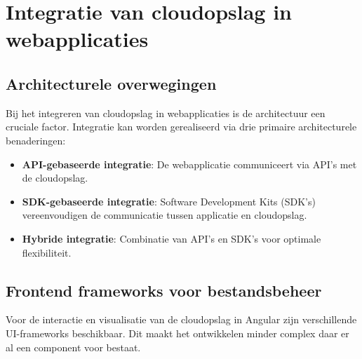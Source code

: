 \section{Integratie van cloudopslag in webapplicaties}
\subsection{Architecturele overwegingen}
Bij het integreren van cloudopslag in webapplicaties is de architectuur een cruciale factor. Integratie kan worden gerealiseerd via drie primaire architecturele benaderingen:
\begin{itemize}
  \item \textbf{API-gebaseerde integratie}: De webapplicatie communiceert via API's met de cloudopslag.
  \item \textbf{SDK-gebaseerde integratie}: Software Development Kits (SDK's) vereenvoudigen de communicatie tussen applicatie en cloudopslag.
  \item \textbf{Hybride integratie}: Combinatie van API's en SDK's voor optimale flexibiliteit.
\end{itemize}

\subsection{Frontend frameworks voor bestandsbeheer}
Voor de interactie en visualisatie van de cloudopslag in Angular zijn verschillende UI-frameworks beschikbaar. Dit maakt het ontwikkelen minder complex daar er al een component voor bestaat.

